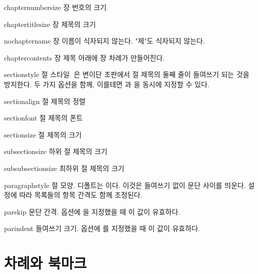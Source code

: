 \documentclass[minted]{hzguide}
\begin{document}
\begin{macros}
\item[chapternumbersize] \keyvalue{\HUGE}
장 번호의 크기

\item[chaptertitlesize] \keyvalue{\Huge}
장 제목의 크기 

\item[nochaptername] \keyvalueTF 
장 이름이 식자되지 않는다. "제"도 식자되지 않는다.

\item[chaptercontents] \keyvalueTF
장 제목 아래에 장 차례가 만들어진다.

\item[sectionstyle] 
절 스타일. 은 변이단 조판에서 절 제목의 둘째 줄이 들여쓰기 되는 것을 방지한다.
두 가지 옵션을 함께, 이를테면 과 을 동시에 지정할 수 있다.

\item[sectionalign] \keyvalue{\raggedleft, \centering, \raggedright}
절 제목의 정렬

\item[sectionfont] \keyvalue{\normalfont\bfseries}
절 제목의 폰트

\item[sectionsize] \keyvalue{\Large}
절 제목의 크기

\item[subsectionsize] \keyvalue{\large}
하위 절 제목의 크기

\item[subsubsectionsize] \keyvalue{\normalsize}
최하위 절 제목의 크기

\item[paragraphstyle] 
절 모양. 디폴트는 이다. 이것은 들여쓰기 없이 문단 사이를 띄운다.
설정에 따라 목록들의 항목 간격도 함께 조정된다.

\item[parskip] \keyvalue{0.25\onelineskip}
문단 간격.  옵션에 을 지정했을 때 이 값이 유효하다.

\item[parindent] \keyvalue{1em}
들여쓰기 크기.  옵션에 를 지정했을 때 이 값이 유효하다.
\end{macros}

\section{차례와 북마크}
\end{document}
